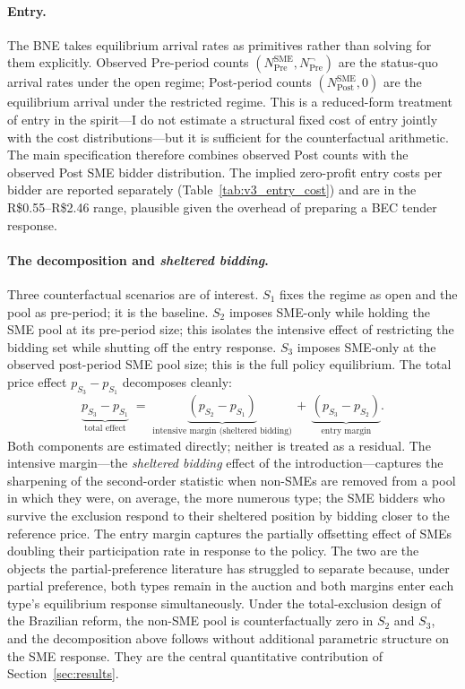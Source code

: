 \paragraph{Entry.} The BNE takes equilibrium arrival rates as primitives rather than solving for them explicitly. Observed Pre-period counts $(N^{\text{SME}}_{\text{Pre}}, N^{\neg}_{\text{Pre}})$ are the status-quo arrival rates under the open regime; Post-period counts $(N^{\text{SME}}_{\text{Post}}, 0)$ are the equilibrium arrival under the restricted regime. This is a reduced-form treatment of entry in the \citet{atheyseira2011} spirit---I do not estimate a structural fixed cost of entry jointly with the cost distributions---but it is sufficient for the counterfactual arithmetic. The main specification therefore combines observed Post counts with the observed Post SME bidder distribution. The implied zero-profit entry costs per bidder are reported separately (Table~\ref{tab:v3_entry_cost}) and are in the R\$0.55--R\$2.46 range, plausible given the overhead of preparing a BEC tender response.

\paragraph{The decomposition and \emph{sheltered bidding}.} Three counterfactual scenarios are of interest. $S_1$ fixes the regime as open and the pool as pre-period; it is the baseline. $S_2$ imposes SME-only while holding the SME pool at its pre-period size; this isolates the intensive effect of restricting the bidding set while shutting off the entry response. $S_3$ imposes SME-only at the observed post-period SME pool size; this is the full policy equilibrium. The total price effect $p_{S_3} - p_{S_1}$ decomposes cleanly:
\begin{equation}
\underbrace{p_{S_3} - p_{S_1}}_{\text{total effect}}
\;=\; \underbrace{(p_{S_2} - p_{S_1})}_{\text{intensive margin (sheltered bidding)}}
   \,+\, \underbrace{(p_{S_3} - p_{S_2})}_{\text{entry margin}}.
\end{equation}
Both components are estimated directly; neither is treated as a residual. The intensive margin---the \emph{sheltered bidding} effect of the introduction---captures the sharpening of the second-order statistic when non-SMEs are removed from a pool in which they were, on average, the more numerous type; the SME bidders who survive the exclusion respond to their sheltered position by bidding closer to the reference price. The entry margin captures the partially offsetting effect of SMEs doubling their participation rate in response to the policy. The two are the objects the partial-preference literature \citep{marion2007, krasnokutskaya2011, atheyseira2011} has struggled to separate because, under partial preference, both types remain in the auction and both margins enter each type's equilibrium response simultaneously. Under the total-exclusion design of the Brazilian reform, the non-SME pool is counterfactually zero in $S_2$ and $S_3$, and the decomposition above follows without additional parametric structure on the SME response. They are the central quantitative contribution of Section~\ref{sec:results}.

